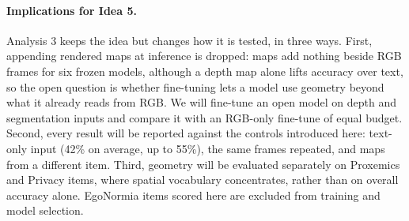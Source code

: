 \paragraph{Implications for Idea 5.} Analysis 3 keeps the idea but changes how it is tested, in three ways. First, appending rendered maps at inference is dropped: maps add nothing beside RGB frames for six frozen models, although a depth map alone lifts accuracy over text, so the open question is whether fine-tuning lets a model use geometry beyond what it already reads from RGB. We will fine-tune an open model on depth and segmentation inputs and compare it with an RGB-only fine-tune of equal budget. Second, every result will be reported against the controls introduced here: text-only input (42\% on average, up to 55\%), the same frames repeated, and maps from a different item. Third, geometry will be evaluated separately on Proxemics and Privacy items, where spatial vocabulary concentrates, rather than on overall accuracy alone. EgoNormia items scored here are excluded from training and model selection.
